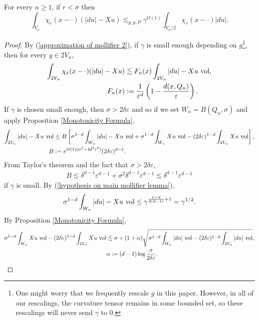 \begin{sublemma}
For every $n \geq 1$, if $r < \sigma$ then
$$\int_{V_n} \chi_\varepsilon(x - \cdot)(|du| - Xu) \lesssim_{g, p, P} \gamma^{O(1)} \int_{V_n/2} \chi_\varepsilon(x - \cdot)|du|.$$
\end{sublemma}
\begin{proof}
By (\ref{approximation of mollifier 2}), if $\gamma$ is small enough depending on $g$\footnote{One might worry that we frequently rescale $g$ in this paper.
However, in all of our rescalings, the curvature tensor remains in some bounded set, so these rescalings will never send $\gamma$ to $0$.}, then for every $y \in 2V_n$,
\begin{align*}
\int_{2V_n} \chi_\varepsilon(x - \cdot)(|du| - Xu) &\lesssim F_n(x) \int_{2V_n} |du| - Xu ~\mathrm{vol}, \\
F_n(x) &:= \frac{1}{\varepsilon^d}\left(1 - \frac{d(x, Q_n)}{\varepsilon}\right).
\end{align*}
If $\gamma$ is chosen small enough, then $\sigma > 2\delta\varepsilon$ and so if we set $W_n = B(Q_n, \sigma)$ and apply Proposition \ref{Monotonicity Formula},
\begin{align*}
\int_{2V_n}|du| - Xu ~\mathrm{vol} &\leq
B \left[\sigma^{1 - d}\int_{W_n} |du| - Xu ~\mathrm{vol} + \sigma^{1 - d}\int_{W_n} Xu ~\mathrm{vol} - (2\delta\varepsilon)^{1 - d}\int_{2V_n} Xu ~\mathrm{vol} \right],\\
B &:= e^{O(1)(\sigma^2 - 4\delta^2\varepsilon^2)}(2\delta\varepsilon)^{d - 1}.
\end{align*}
From Taylor's theorem and the fact that $\sigma > 2\delta\varepsilon$,
\begin{align*}
B \lesssim \delta^{d - 1} \varepsilon^{d - 1} + \sigma^2 \delta^{d - 1} \varepsilon^{d - 1} \lesssim \delta^{d - 1} \varepsilon^{d - 1}
\end{align*}
if $\gamma$ is small.
By (\ref{hypothesis on main mollifier lemma}),
$$\sigma^{1 - d}\int_{W_n} |du| - Xu ~\mathrm{vol} \leq \gamma^{\frac{1 - d}{2(d - 1)} + 1} = \gamma^{1/2}.$$
By Proposition \ref{Monotonicity Formula},
\begin{align*}
\sigma^{1 - d}\int_{W_n} Xu ~\mathrm{vol} - (2\delta\varepsilon)^{1 - d}\int_{2V_n} Xu ~\mathrm{vol} &\lesssim \sigma + (1 + \alpha)\sqrt{\sigma^{1 - d} \int_{W_n} |du| ~\mathrm{vol} - (2\delta\varepsilon)^{1 - d} \int_{2V_n} |du| ~\mathrm{vol}},\\
&\alpha := (d - 1)\log \frac{\sigma}{2\delta\varepsilon}.
\end{align*}


\end{proof}
